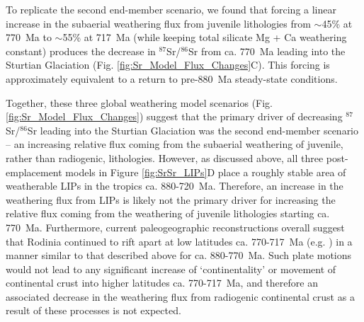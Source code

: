 \documentclass[11pt,letterpaper]{article}
\newcommand{\SrSr}{$^{87}$Sr/$^{86}$Sr\xspace}
\begin{document}
To replicate the second end-member scenario, we found that forcing a linear increase in the subaerial weathering flux from juvenile lithologies from $\sim$45\% at 770~Ma to $\sim$55\% at 717~Ma (while keeping total silicate Mg + Ca weathering constant) produces the decrease in \SrSr from ca. 770~Ma leading into the Sturtian Glaciation (Fig. \ref{fig:Sr_Model_Flux_Changes}C). This forcing is approximately equivalent to a return to pre-880~Ma steady-state conditions.

Together, these three global weathering model scenarios (Fig. \ref{fig:Sr_Model_Flux_Changes}) suggest that the primary driver of decreasing \SrSr leading into the Sturtian Glaciation was the second end-member scenario -- an increasing relative flux coming from the subaerial weathering of juvenile, rather than radiogenic, lithologies. However, as discussed above, all three post-emplacement models in Figure \ref{fig:SrSr_LIPs}D place a roughly stable area of weatherable LIPs in the tropics ca. 880-720~Ma. Therefore, an increase in the weathering flux from LIPs is likely not the primary driver for increasing the relative flux coming from the weathering of juvenile lithologies starting ca. 770~Ma. Furthermore, current paleogeographic reconstructions overall suggest that Rodinia continued to rift apart at low latitudes ca. 770-717~Ma (e.g. \citealp{Li2008a}) in a manner similar to that described above for ca. 880-770~Ma. Such plate motions would not lead to any significant increase of `continentality' or movement of continental crust into higher latitudes ca. 770-717~Ma, and therefore an associated decrease in the weathering flux from radiogenic continental crust as a result of these processes is not expected.
\end{document}
